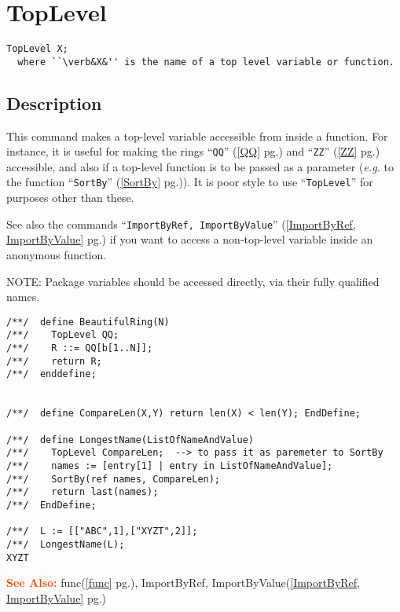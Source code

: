 \documentclass[a4paper]{mybook}
\newenvironment{command}{}{} %
\newcommand\SeeAlso{\par\textcolor{OrangeRed}{\textbf{\large See Also: }}}
\begin{document}
\section{TopLevel}
\label{TopLevel}
\begin{command} %


\begin{Verbatim}[label=syntax, rulecolor=\color{MidnightBlue},
frame=single]
TopLevel X;
  where ``\verb&X&'' is the name of a top level variable or function.
\end{Verbatim}


\subsection*{Description}

This command makes a top-level variable accessible from inside a
function.  For instance, it is useful for making the rings ``\verb&QQ&'' (\ref{QQ} pg.\pageref{QQ}) and
``\verb&ZZ&'' (\ref{ZZ} pg.\pageref{ZZ}) accessible, and also if a top-level function is to be passed as
a parameter (\textit{e.g.} to the function ``\verb&SortBy&'' (\ref{SortBy} pg.\pageref{SortBy})).  It is poor style to
use ``\verb&TopLevel&'' for purposes other than these.
\par 
See also the commands ``\verb&ImportByRef, ImportByValue&'' (\ref{ImportByRef, ImportByValue} pg.\pageref{ImportByRef, ImportByValue}) if you want to
access a non-top-level variable inside an anonymous function.
\par 
NOTE: Package variables should be accessed directly, via their fully
qualified names.
\begin{Verbatim}[label=example, rulecolor=\color{PineGreen}, frame=single]
/**/  define BeautifulRing(N)
/**/    TopLevel QQ;
/**/    R ::= QQ[b[1..N]];
/**/    return R;
/**/  enddefine;


/**/  define CompareLen(X,Y) return len(X) < len(Y); EndDefine;

/**/  define LongestName(ListOfNameAndValue)
/**/    TopLevel CompareLen;  --> to pass it as paremeter to SortBy
/**/    names := [entry[1] | entry in ListOfNameAndValue];
/**/    SortBy(ref names, CompareLen);
/**/    return last(names);
/**/  EndDefine;

/**/  L := [["ABC",1],["XYZT",2]];
/**/  LongestName(L);
XYZT
\end{Verbatim}


\SeeAlso %
  func(\ref{func} pg.\pageref{func}), 
    ImportByRef, ImportByValue(\ref{ImportByRef, ImportByValue} pg.\pageref{ImportByRef, ImportByValue})
\end{command} %
\end{document}
